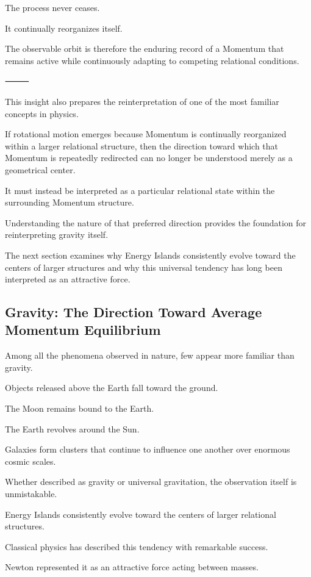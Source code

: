 The process never ceases.

It continually reorganizes itself.

The observable orbit is therefore the enduring record of a Momentum that remains active while continuously adapting to competing relational conditions.

⸻

This insight also prepares the reinterpretation of one of the most familiar concepts in physics.

If rotational motion emerges because Momentum is continually reorganized within a larger relational structure, then the direction toward which that Momentum is repeatedly redirected can no longer be understood merely as a geometrical center.

It must instead be interpreted as a particular relational state within the surrounding Momentum structure.

Understanding the nature of that preferred direction provides the foundation for reinterpreting gravity itself.

The next section examines why Energy Islands consistently evolve toward the centers of larger structures and why this universal tendency has long been interpreted as an attractive force.

\subsection*{\textbf{Gravity: The Direction Toward Average Momentum Equilibrium}}

Among all the phenomena observed in nature, few appear more familiar than gravity.

Objects released above the Earth fall toward the ground.

The Moon remains bound to the Earth.

The Earth revolves around the Sun.

Galaxies form clusters that continue to influence one another over enormous cosmic scales.

Whether described as gravity or universal gravitation, the observation itself is unmistakable.

Energy Islands consistently evolve toward the centers of larger relational structures.

Classical physics has described this tendency with remarkable success.

Newton represented it as an attractive force acting between masses.

